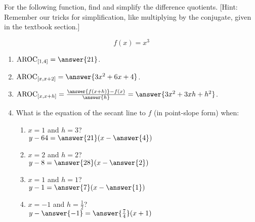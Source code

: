\documentclass{ximera}
\author{Elizabeth Campolongo}
\begin{document}
\begin{exercise}

For the following function, 
find and simplify the difference quotients. [Hint: Remember our tricks for simplification, like multiplying by the conjugate, given in the textbook section.]

$$f(x)= x^3$$

\begin{enumerate}
\item $\av_{[1,4]} = \answer{21}$.


\item $\av_{[x,x+2]} =  \answer{3x^2+6x+4}$.


\item $\av_{[x,x+h]} = \frac{\answer{f(x+h)}-f(x)}{\answer{h}} = \answer{3x^2+3xh+h^2}$.  


\item What is the equation of the secant line to $f$ (in point-slope form) when: 
\begin{enumerate}
\item  $x = 1$ and $h=3$?\\
$y-64= \answer{21}(x-\answer{4})$

\item $x = 2$ and $h=2$? \\
$y-8= \answer{28}(x-\answer{2})$

\item  $x = 1$ and $h=1$?\\
$y-1= \answer{7}(x-\answer{1})$

\item $x=-1$ and $h = \frac{1}{2}$? \\
$y-\answer{-1}= \answer{\frac{7}{4}}(x+1)$
\end{enumerate}

\end{enumerate}
\end{exercise}
\end{document}
